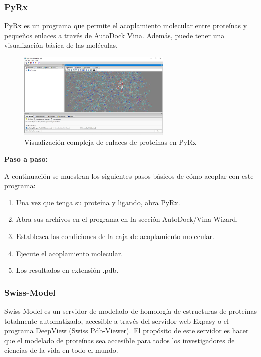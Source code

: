 \documentclass[11pt, letterpaper, spanish]{article}
\begin{document}
{{\subsubsection{PyRx}
\par{PyRx es un programa que permite el acoplamiento molecular entre proteínas y pequeños enlaces a través de AutoDock Vina. Además, puede tener una visualización básica de las moléculas.}

\begin{figure}
	    \centering
		\caption{Visualización compleja de enlaces de proteínas en PyRx
            \cite{Dallakyan_2014}}
		      \includegraphics[width=0.65\textwidth]{pyrx.jpg}
	    \end{figure}

    \par{\textbf{Paso a paso:}}
    \par{A continuación se muestran los siguientes pasos básicos de cómo acoplar con este programa:}
    \begin{enumerate}[1.]
        \item Una vez que tenga su proteína y ligando, abra PyRx.
        \item Abra sus archivos en el programa en la sección AutoDock/Vina Wizard.
        \item Establezca las condiciones de la caja de acoplamiento molecular.
        \item Ejecute el acoplamiento molecular.
        \item Los resultados en extensión .pdb.
    \end{enumerate}

 \subsubsection{Swiss-Model}
    \par{Swiss-Model es un servidor de modelado de homología de estructuras de proteínas totalmente automatizado, accesible a través del servidor web Expasy o el programa DeepView (Swiss Pdb-Viewer). El propósito de este servidor es hacer que el modelado de proteínas sea accesible para todos los investigadores de ciencias de la vida en todo el mundo.}

}}
\end{document}
